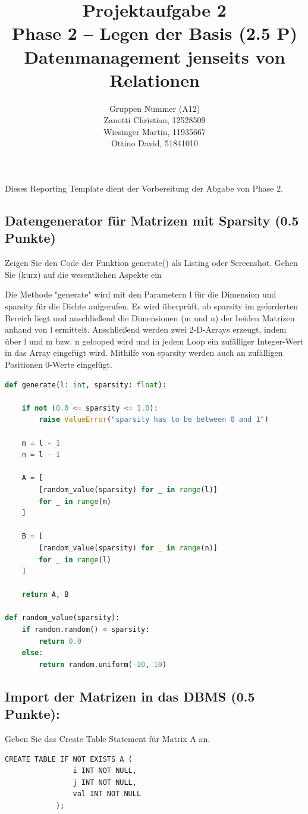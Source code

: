 \documentclass[11pt]{scrartcl}
\title{
  \textbf{\large Projektaufgabe 2 } \\
  Phase 2 – Legen der Basis (2.5 P) \\
  {\large Datenmanagement jenseits von Relationen}
}
\author{
  Gruppen Nummer (A12) \\
  \large Zanotti Christian, 12528509 \\
  \large Wiesinger Martin, 11935667  \\
  \large Ottino David, 51841010
}
\begin{document}
\maketitle\thispagestyle{empty}

Dieses Reporting Template dient der Vorbereitung der Abgabe von Phase 2.

\subsection*{Datengenerator für Matrizen mit Sparsity (0.5 Punkte)}

Zeigen Sie den Code der Funktion generate() als Listing oder Screenshot. Gehen Sie
(kurz) auf die wesentlichen Aspekte ein

Die Methode "generate" wird mit den Parametern l für die Dimension und sparsity für die Dichte aufgerufen. Es wird überprüft, ob sparsity im geforderten Bereich liegt und anschließend die Dimensionen (m und n) der beiden Matrizen anhand von l ermittelt. Anschließend werden zwei 2-D-Arrays erzeugt, indem über l und m bzw. n gelooped wird und in jedem Loop ein zufälliger Integer-Wert in das Array eingefügt wird. Mithilfe von sparsity werden auch an zufälligen Positionen 0-Werte eingefügt.

\begin{lstlisting}[language=Python]
def generate(l: int, sparsity: float):

    if not (0.0 <= sparsity <= 1.0):
        raise ValueError("sparsity has to be between 0 and 1")

    m = l - 1
    n = l - 1

    A = [
        [random_value(sparsity) for _ in range(l)]
        for _ in range(m)
    ]

    B = [
        [random_value(sparsity) for _ in range(n)]
        for _ in range(l)
    ]

    return A, B

def random_value(sparsity):
    if random.random() < sparsity:
        return 0.0
    else:
        return random.uniform(-10, 10)
\end{lstlisting}

\subsection*{Import der Matrizen in das DBMS (0.5 Punkte):}

Geben Sie das Create Table Statement für Matrix A an.

\begin{lstlisting}[style=dmrsql]
CREATE TABLE IF NOT EXISTS A (
                i INT NOT NULL,
                j INT NOT NULL,
                val INT NOT NULL
            );
\end{lstlisting}
\end{document}
